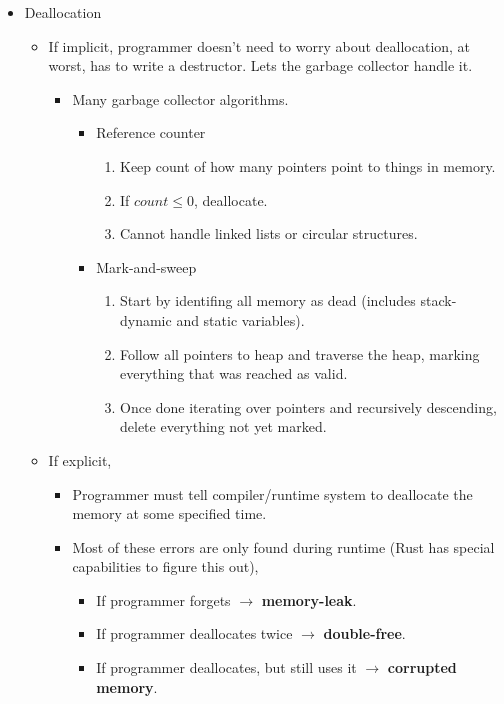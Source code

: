 \begin{itemize}
\item Deallocation
  \begin{itemize}[noitemsep]
  \item If implicit, programmer doesn't need to worry about deallocation, at worst, has to write a destructor. Lets the garbage collector handle it.
    \begin{itemize}[noitemsep]
    \item Many garbage collector algorithms.
      \begin{itemize}[noitemsep]
      \item Reference counter
        \begin{enumerate}[noitemsep]
        \item Keep count of how many pointers point to things in memory.
        \item If $count \leq 0$, deallocate.
        \item Cannot handle linked lists or circular structures.
        \end{enumerate}
      \item Mark-and-sweep
        \begin{enumerate}[noitemsep]
        \item Start by identifing all memory as dead (includes stack-dynamic and static variables).
        \item Follow all pointers to heap and traverse the heap, marking everything that was reached as valid.
        \item Once done iterating over pointers and recursively descending, delete everything not yet marked.
        \end{enumerate}
      \end{itemize}
    \end{itemize}
  \item If explicit,
    \begin{itemize}[noitemsep]
    \item Programmer must tell compiler/runtime system to deallocate the memory at some specified time.
    \item Most of these errors are only found during runtime (Rust has special capabilities to figure this out),
      \begin{itemize}[noitemsep]
      \item If programmer forgets $\rightarrow$ \textbf{memory-leak}.
      \item If programmer deallocates twice $\rightarrow$ \textbf{double-free}.
      \item If programmer deallocates, but still uses it $\rightarrow$ \textbf{corrupted memory}.
      \end{itemize}
    \end{itemize}
  \end{itemize}
\end{itemize}

